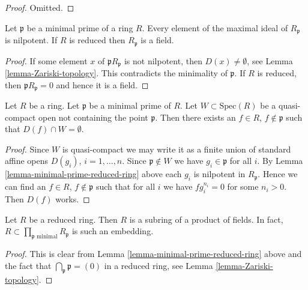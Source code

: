 \begin{proof}
Omitted.
\end{proof}


\begin{lemma}
\label{lemma-minimal-prime-reduced-ring}
Let $\mathfrak p$ be a minimal prime of a ring $R$.
Every element of the maximal ideal of $R_{\mathfrak p}$
is nilpotent. If $R$ is reduced then $R_{\mathfrak p}$
is a field.
\end{lemma}

\begin{proof}
If some element $x$ of ${\mathfrak p}R_{\mathfrak p}$
is not nilpotent, then $D(x) \not = \emptyset$, see
Lemma \ref{lemma-Zariski-topology}. This contradicts
the minimality of $\mathfrak p$. If $R$ is reduced,
then ${\mathfrak p}R_{\mathfrak p} = 0$ and
hence it is a field.
\end{proof}

\begin{lemma}
\label{lemma-standard-open-containing-maximal-point}
Let $R$ be a ring.
Let $\mathfrak p$ be a minimal prime of $R$.
Let $W \subset \text{Spec}(R)$ be a quasi-compact open
not containing the point $\mathfrak p$. Then there
exists an $f \in R$, $f \not \in \mathfrak p$ such
that $D(f) \cap W = \emptyset$.
\end{lemma}

\begin{proof}
Since $W$ is quasi-compact we may write it as a finite union
of standard affine opens $D(g_i)$, $i = 1, \ldots, n$.
Since $\mathfrak p \not \in W$ we have $g_i \in \mathfrak p$ for
all $i$. By Lemma \ref{lemma-minimal-prime-reduced-ring} above
each $g_i$ is nilpotent in $R_{\mathfrak p}$. Hence we can find
an $f \in R$, $f \not \in \mathfrak p$ such that for all $i$ we have
$f g_i^{n_i} = 0$ for some $n_i > 0$. Then $D(f)$ works.
\end{proof}

\begin{lemma}
\label{lemma-reduced-ring-sub-product-fields}
Let $R$ be a reduced ring.
Then $R$ is a subring of a product of fields.
In fact, $R \subset \prod_{\mathfrak p\text{ minimal}} R_{\mathfrak p}$
is such an embedding.
\end{lemma}

\begin{proof}
This is clear from Lemma \ref{lemma-minimal-prime-reduced-ring} above
and the fact that $\bigcap_{\mathfrak p} \mathfrak p = (0)$
in a reduced ring, see Lemma \ref{lemma-Zariski-topology}.
\end{proof}














